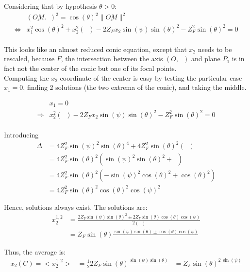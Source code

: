 \documentclass[a4paper,11pt,twoside,titlepage,openright]{book}
\numberwithin{equation}{section}
\newcommand{\lt}{\left}
\newcommand{\rt}{\right}
\DeclareMathOperator{\ez}{\underline{e}_z}
\DeclareMathOperator{\DD}{\cos(\theta)^2 - \sin(\psi)^2}
\begin{document}
Considering that by hypothesis $\theta>0$:
$$
\begin{array}{lll}
	& (\underline{OM}.\ez)^2 = \cos(\theta)^2 \|\underline{OM}\|^2\\
	\Leftrightarrow & x_1^2\cos(\theta)^2 + x_2^2\lt(\DD\rt) - 2Z_Fx_2\sin(\psi)\sin(\theta)^2 - Z_F^2\sin(\theta)^2 = 0\\
\end{array}
$$

This looks like an almost reduced conic equation, except that $x_2$ needs to be rescaled, because $F$, the intersection between the axis $(O, \ez)$ and plane $P_1$ is in fact not the center of the conic but one of its focal points.\\
Computing the $x_2$ coordinate of the center is easy by testing the particular case $x_1=0$, finding 2 solutions (the two extrema of the conic), and taking the middle.

$$
\begin{array}{lll}
	& x_1 = 0\\
	\Rightarrow & x_2^2\lt(\DD\rt) - 2Z_Fx_2\sin(\psi)\sin(\theta)^2 - Z_F^2\sin(\theta)^2 = 0\\
\end{array}
$$

Introducing
$$
\begin{array}{lll}
	\Delta & = 4Z_F^2\sin(\psi)^2\sin(\theta)^4 + 4Z_F^2\sin(\theta)^2\lt(\DD\rt)\\
	       & = 4Z_F^2\sin(\theta)^2 \lt( \sin(\psi)^2\sin(\theta)^2 + \DD \rt)\\
	       & = 4Z_F^2\sin(\theta)^2 \lt( -\sin(\psi)^2\cos(\theta)^2 + \cos(\theta)^2 \rt)\\
	       & = 4Z_F^2\sin(\theta)^2 \cos(\theta)^2\cos(\psi)^2
\end{array}
$$

Hence, solutions always exist.
The solutions are:
$$
\begin{array}{lll}
	x_2^{1,2} & = \frac{2Z_F\sin(\psi)\sin(\theta)^2  \pm 2Z_F\sin(\theta) \cos(\theta) \cos(\psi)}{2\lt(\DD\rt)}\\
	          & = Z_F\sin(\theta) \frac{\sin(\psi)\sin(\theta) \pm \cos(\theta)\cos(\psi)}{\DD}
\end{array}
$$

Thus, the average is:
$$
\begin{array}{lll}
	x_2(C) = <x_2^{1,2}> & = \frac{1}{2} 2 Z_F\sin(\theta) \frac{\sin(\psi)\sin(\theta)}{\DD}
	                      & = Z_F\sin(\theta)^2 \frac{\sin(\psi)}{\DD}
\end{array}
$$
\end{document}
